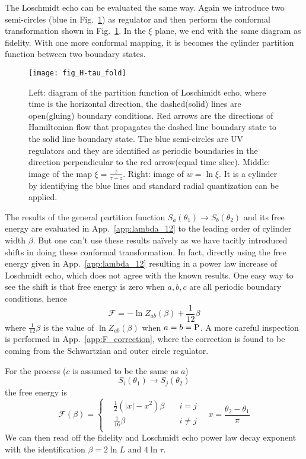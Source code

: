 The Loschmidt echo can be evaluated the same way. Again we introduce two semi-circles (blue in Fig.~\ref{fig:H-tau_fold}) as regulator and then perform the conformal transformation shown in Fig.~\ref{fig:H-tau_fold}. In the $\xi$ plane, we end with the same diagram as fidelity. With one more conformal mapping, it is becomes the cylinder partition function between two boundary states. 

\begin{figure}[htb]
\centering
\texttt{[image: fig\_H-tau\_fold]}
\caption{Left: diagram of the partition function of Loschimidt echo, where time is the horizontal direction, the dashed(solid) lines are open(gluing) boundary conditions. Red arrows are the directions of Hamiltonian flow that propagates the dashed line boundary state to the solid line boundary state. The blue semi-circles are UV regulators and they are identified as periodic boundaries in the direction perpendicular to the red arrow(equal time slice). Middle: image of the map $\xi = \frac{z}{\tau - z}$. Right: image of $w = \ln \xi$. It is a cylinder by identifying the blue lines and standard radial quantization can be applied. }
\label{fig:H-tau_fold}
\end{figure}

The results of the general partition function $S_a( \theta_1 ) \rightarrow S_b( \theta_2)$ and its free energy are evaluated in App.~\ref{app:lambda_12} to the leading order of cylinder width $\beta$. But one can't use these results na\"ively as we have tacitly introduced shifts in doing these conformal transformation. In fact, directly using the free energy given in App.~\ref{app:lambda_12} resulting in a power law increase of Loschmidt echo, which does not agree with the known results. One easy way to see the shift is that free energy is zero when $a,b,c$ are all periodic boundary conditions, hence 
\begin{equation}
\mathcal{F} = - \ln Z_{ab} ( \beta ) + \frac{1}{12} \beta 
\end{equation}
where $\frac{1}{12}\beta$ is the value of $ \ln Z_{ab} ( \beta )$ when $a = b = {\rm P}$. A more careful inspection is performed in App.~\ref{app:F_correction}, where the correction is found to be coming from the Schwartzian and outer circle regulator. 

For the process ($c$ is assumed to be the same as $a$)
\begin{equation}
S_i( \theta_1 ) \rightarrow S_j( \theta_2 ) 
\end{equation}
the free energy is
\begin{equation}
\mathcal{F}( \beta )  = 
\left\lbrace
\begin{aligned}
  &\frac{1}{2}(|x| - x^2 )\beta  \quad &i = j \\
  &\frac{1}{16}\beta   \quad &i \ne j   \\
\end{aligned} \right. \quad x = \frac{\theta_2 - \theta_1}{\pi} 
\end{equation}
We can then read off the fidelity and Loschmidt echo power law decay exponent with the identification $\beta = 2 \ln L$ and $ 4 \ln \tau$. 

